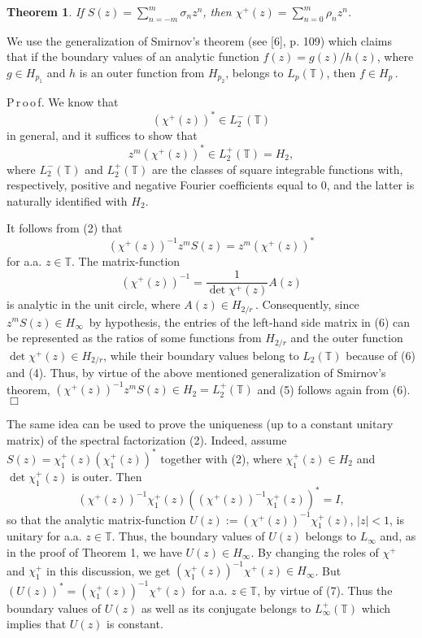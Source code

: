 \documentclass[12pt]{amsart}
\newcommand{\iy}{\infty}
\newcommand{\sg}{\sigma}
\newcommand{\bT}{\mathbb{T}}
\newtheorem{theorem}{\bf  Theorem}
\theoremstyle{remark}
\renewenvironment{proof}{ P\,r\,o\,o\,f.}{$\Box$}
\begin{document}
\begin{theorem}
If $S(z)=\sum_{n=-m}^m\sg_nz^n$, then $\chi^+(z)=
\sum_{n=0}^m\rho_nz^n$.
\end{theorem}

We use the generalization of Smirnov's theorem (see [6], p. 109)
which claims that if the boundary values of an analytic function
$f(z)=g(z)/h(z)$, where $g\in H_{p_1}$ and $h$ is an outer function
from $H_{p_2}$, belongs to $L_p({\mathbb T})$, then $f\in H_p$\,.

\smallskip

\begin{proof}
We know that
\begin{equation}
(\chi^+(z))^*\in L_2^-(\bT)
\end{equation}
in general, and it suffices to show that
\begin{equation}
    z^m(\chi^+(z))^*\in L_2^+(\bT)=H_2,
\end{equation}
where $L_2^-(\bT)$ and $L_2^+(\bT)$ are the classes of square
integrable functions with, respectively, positive and negative
Fourier coefficients equal to $0$, and the latter is naturally
identified with $H_2$.

It follows from (2) that
\begin{equation}
 (\chi^+(z))^{-1}z^m S(z)=z^m(\chi^+(z))^*
\end{equation}
for a.a. $z\in\bT$. The matrix-function $$(\chi^+(z))^{-1}=\frac
1{\det\chi^+(z)}A(z)$$ is analytic in the unit circle, where
$A(z)\in H_{2/r}$\,. Consequently, since  $z^mS(z)\in H_\iy\,$ by
hypothesis, the entries of the left-hand side matrix in (6) can be
represented as the ratios of some functions from $H_{2/r}$ and the
outer function $\det\chi^+(z)\in H_{2/r}$, while their boundary
values belong to $L_2(\bT)$ because of (6) and (4). Thus, by virtue
of the above mentioned generalization of Smirnov's theorem,
$(\chi^+(z))^{-1}z^m S(z)\in H_2=L_2^+(\bT)$ and (5) follows again
from (6).
\end{proof}
\smallskip

The same  idea can be used to prove the uniqueness (up to a constant
unitary matrix) of the spectral factorization (2). Indeed, assume
$S(z)=\chi^+_1(z)(\chi^+_1(z))^*$ together with (2), where
$\chi^+_1(z)\in H_2$ and $\det\chi^+_1(z)$ is outer. Then
\begin{equation}
 (\chi^+(z))^{-1}\chi^+_1(z)((\chi^+(z))^{-1}\chi^+_1(z))^*=I,
\end{equation}
so that the analytic matrix-function
$U(z):=(\chi^+(z))^{-1}\chi^+_1(z)$, $|z|<1$, is unitary  for a.a.
$z\in\bT$. Thus, the boundary values of $U(z)$ belongs to $L_\iy$
and, as in the proof of Theorem 1, we have $U(z)\in H_\iy$. By
changing the roles of $\chi^+$ and $\chi^+_1$ in this discussion, we
get $(\chi^+_1(z))^{-1}\chi^+(z)\in H_\iy$. But
$(U(z))^*=(\chi^+_1(z))^{-1}\chi^+(z)$ for a.a. $z\in\bT$, by virtue
of (7). Thus the boundary values of $U(z)$ as well as its conjugate
belongs to $L_\iy^+(\bT)$ which implies that $U(z)$ is constant.
\end{document}
